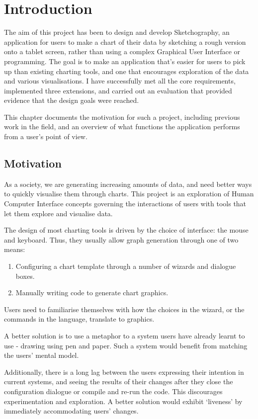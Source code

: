 \chapter{Introduction}
\label{cha:introduction}
The aim of this project has been to design and develop Sketchography, an application for users to make a chart of their data by sketching a rough version onto a tablet screen, rather than using a complex Graphical User Interface or programming. The goal is to make an application that's easier for users to pick up than existing charting tools, and one that encourages exploration of the data and various visualisations. I have successfully met all the core requirements, implemented three extensions, and carried out an evaluation that provided evidence that the design goals were reached.

This chapter documents the motivation for such a project, including previous work in the field, and an overview of what functions the application performs from a user's point of view.

\section{Motivation}
As a society, we are generating increasing amounts of data, and need better ways to quickly visualise them through charts. This project is an exploration of Human Computer Interface concepts governing the interactions of users with tools that let them explore and visualise data.

The design of most charting tools is driven by the choice of interface: the mouse and keyboard. Thus, they usually allow graph generation through one of two means:
\begin{enumerate}
\item Configuring a chart template through a number of wizards and dialogue boxes.
\item Manually writing code to generate chart graphics.
\end{enumerate}

Users need to familiarise themselves with how the choices in the wizard, or the commands in the language, translate to graphics.

A better solution is to use a metaphor to a system users have already learnt to use - drawing using pen and paper. Such a system would benefit from matching the users' mental model. 

Additionally, there is a long lag between the users expressing their intention in current systems, and seeing the results of their changes after they close the configuration dialogue or compile and re-run the code. This discourages experimentation and exploration. A better solution would exhibit `liveness' by immediately accommodating users' changes.

